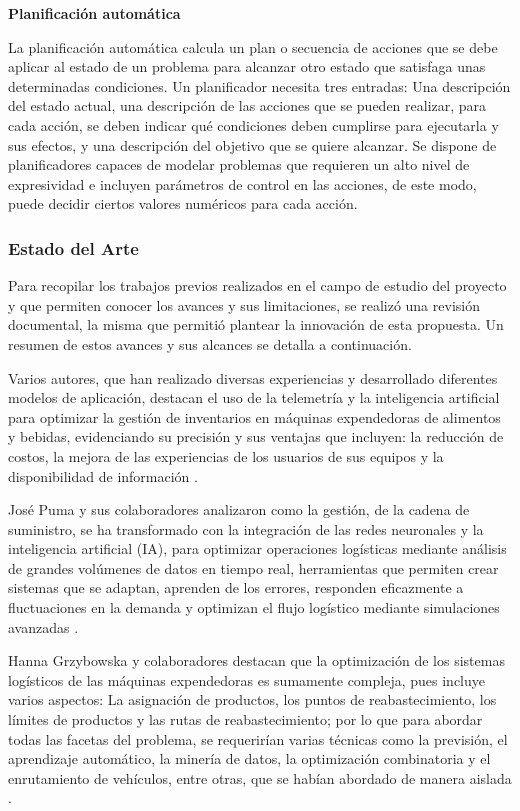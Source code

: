 \textbf{Planificación automática} \citep{navarro2026,zafra2021}

La planificación automática calcula un plan o secuencia de acciones que se debe aplicar al estado de un problema para alcanzar otro estado que satisfaga unas determinadas condiciones. Un planificador necesita tres entradas: Una descripción del estado actual, una descripción de las acciones que se pueden realizar, para cada acción, se deben indicar qué condiciones deben cumplirse para ejecutarla y sus efectos, y una descripción del objetivo que se quiere alcanzar. Se dispone de planificadores capaces de modelar problemas que requieren un alto nivel de expresividad e incluyen parámetros de control en las acciones, de este modo, puede decidir ciertos valores numéricos para cada acción.

\subsubsection{Estado del Arte}\label{estado-del-arte}

Para recopilar los trabajos previos realizados en el campo de estudio del proyecto y que permiten conocer los avances y sus limitaciones, se realizó una revisión documental, la misma que permitió plantear la innovación de esta propuesta. Un resumen de estos avances y sus alcances se detalla a continuación.

Varios autores, que han realizado diversas experiencias y desarrollado diferentes modelos de aplicación, destacan el uso de la telemetría y la inteligencia artificial para optimizar la gestión de inventarios en máquinas expendedoras de alimentos y bebidas, evidenciando su precisión y sus ventajas que incluyen: la reducción de costos, la mejora de las experiencias de los usuarios de sus equipos y la disponibilidad de información \citep{rosello2023,ping2024,vendingsoftware2026}.

José Puma y sus colaboradores analizaron como la gestión, de la cadena de suministro, se ha transformado con la integración de las redes neuronales y la inteligencia artificial (IA), para optimizar operaciones logísticas mediante análisis de grandes volúmenes de datos en tiempo real, herramientas que permiten crear sistemas que se adaptan, aprenden de los errores, responden eficazmente a fluctuaciones en la demanda y optimizan el flujo logístico mediante simulaciones avanzadas \citep{puma2025}.

Hanna Grzybowska y colaboradores destacan que la optimización de los sistemas logísticos de las máquinas expendedoras es sumamente compleja, pues incluye varios aspectos: La asignación de productos, los puntos de reabastecimiento, los límites de productos y las rutas de reabastecimiento; por lo que para abordar todas las facetas del problema, se requerirían varias técnicas como la previsión, el aprendizaje automático, la minería de datos, la optimización combinatoria y el enrutamiento de vehículos, entre otras, que se habían abordado de manera aislada \citep{grzybowska2020}.

